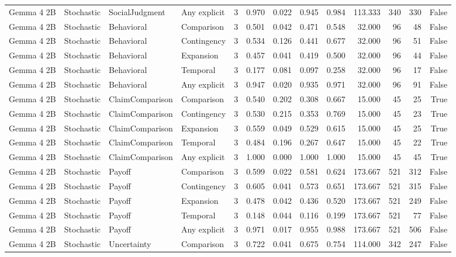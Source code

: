 \begin{tabular}{llllrrrrrrrrr}
Gemma 4 2B & Stochastic & SocialJudgment & Any explicit & 3 & 0.970 & 0.022 & 0.945 & 0.984 & 113.333 & 340 & 330 & False \\
Gemma 4 2B & Stochastic & Behavioral & Comparison & 3 & 0.501 & 0.042 & 0.471 & 0.548 & 32.000 & 96 & 48 & False \\
Gemma 4 2B & Stochastic & Behavioral & Contingency & 3 & 0.534 & 0.126 & 0.441 & 0.677 & 32.000 & 96 & 51 & False \\
Gemma 4 2B & Stochastic & Behavioral & Expansion & 3 & 0.457 & 0.041 & 0.419 & 0.500 & 32.000 & 96 & 44 & False \\
Gemma 4 2B & Stochastic & Behavioral & Temporal & 3 & 0.177 & 0.081 & 0.097 & 0.258 & 32.000 & 96 & 17 & False \\
Gemma 4 2B & Stochastic & Behavioral & Any explicit & 3 & 0.947 & 0.020 & 0.935 & 0.971 & 32.000 & 96 & 91 & False \\
Gemma 4 2B & Stochastic & ClaimComparison & Comparison & 3 & 0.540 & 0.202 & 0.308 & 0.667 & 15.000 & 45 & 25 & True \\
Gemma 4 2B & Stochastic & ClaimComparison & Contingency & 3 & 0.530 & 0.215 & 0.353 & 0.769 & 15.000 & 45 & 23 & True \\
Gemma 4 2B & Stochastic & ClaimComparison & Expansion & 3 & 0.559 & 0.049 & 0.529 & 0.615 & 15.000 & 45 & 25 & True \\
Gemma 4 2B & Stochastic & ClaimComparison & Temporal & 3 & 0.484 & 0.196 & 0.267 & 0.647 & 15.000 & 45 & 22 & True \\
Gemma 4 2B & Stochastic & ClaimComparison & Any explicit & 3 & 1.000 & 0.000 & 1.000 & 1.000 & 15.000 & 45 & 45 & True \\
Gemma 4 2B & Stochastic & Payoff & Comparison & 3 & 0.599 & 0.022 & 0.581 & 0.624 & 173.667 & 521 & 312 & False \\
Gemma 4 2B & Stochastic & Payoff & Contingency & 3 & 0.605 & 0.041 & 0.573 & 0.651 & 173.667 & 521 & 315 & False \\
Gemma 4 2B & Stochastic & Payoff & Expansion & 3 & 0.478 & 0.042 & 0.436 & 0.520 & 173.667 & 521 & 249 & False \\
Gemma 4 2B & Stochastic & Payoff & Temporal & 3 & 0.148 & 0.044 & 0.116 & 0.199 & 173.667 & 521 & 77 & False \\
Gemma 4 2B & Stochastic & Payoff & Any explicit & 3 & 0.971 & 0.017 & 0.955 & 0.988 & 173.667 & 521 & 506 & False \\
Gemma 4 2B & Stochastic & Uncertainty & Comparison & 3 & 0.722 & 0.041 & 0.675 & 0.754 & 114.000 & 342 & 247 & False \\

\end{tabular}
